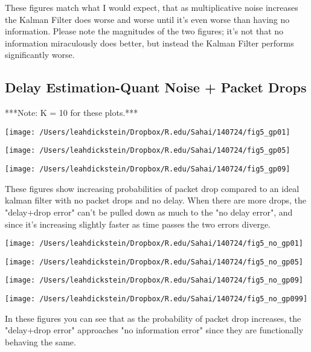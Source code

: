 \documentclass[leqno,twocolumn]{article}
\begin{document}
These figures match what I would expect, that as multiplicative noise increases the Kalman Filter does worse and worse until it's even worse than having no information. Please note the magnitudes of the two figures; it's not that no information miraculously does better, but instead the Kalman Filter performs significantly worse.

\subsection{Delay Estimation-Quant Noise + Packet Drops}
***Note: K = 10 for these plots.***

\begin{minipage}[c]{0.5\textwidth}
\texttt{[image: /Users/leahdickstein/Dropbox/R.edu/Sahai/140724/fig5\_gp01]}
\end{minipage}
\begin{minipage}[c]{0.5\textwidth}
\texttt{[image: /Users/leahdickstein/Dropbox/R.edu/Sahai/140724/fig5\_gp05]}
\end{minipage}

\begin{minipage}[c]{0.5\textwidth}
\texttt{[image: /Users/leahdickstein/Dropbox/R.edu/Sahai/140724/fig5\_gp09]}
\end{minipage}
\begin{minipage}[b]{0.5\textwidth}
These figures show increasing probabilities of packet drop compared to an ideal kalman filter with no packet drops and no delay. When there are more drops, the "delay+drop error" can't be pulled down as much to the "no delay error", and since it's increasing slightly faster as time passes the two errors diverge.
\end{minipage}

\begin{minipage}[c]{0.5\textwidth}
\texttt{[image: /Users/leahdickstein/Dropbox/R.edu/Sahai/140724/fig5\_no\_gp01]}
\end{minipage}
\begin{minipage}[c]{0.5\textwidth}
\texttt{[image: /Users/leahdickstein/Dropbox/R.edu/Sahai/140724/fig5\_no\_gp05]}
\end{minipage}

\begin{minipage}[c]{0.5\textwidth}
\texttt{[image: /Users/leahdickstein/Dropbox/R.edu/Sahai/140724/fig5\_no\_gp09]}
\end{minipage}
\begin{minipage}[c]{0.5\textwidth}
\texttt{[image: /Users/leahdickstein/Dropbox/R.edu/Sahai/140724/fig5\_no\_gp099]}
\end{minipage}

In these figures you can see that as the probability of packet drop increases, the "delay+drop error" approaches "no information error" since they are functionally behaving the same.
\end{document}
